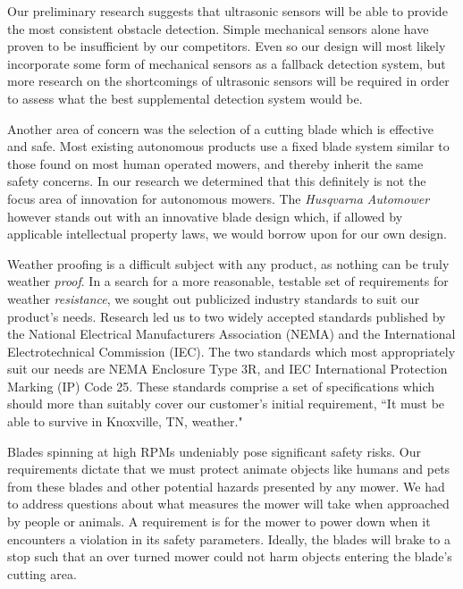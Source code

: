 \documentclass[12pt,letterpaper]{article}
\begin{document}
Our preliminary research suggests that ultrasonic sensors will be able to provide the most consistent obstacle detection.  Simple mechanical sensors alone have proven to be insufficient by our competitors. Even so our design will most likely incorporate some form of mechanical sensors as a fallback detection system, but more research on the shortcomings of ultrasonic sensors will be required in order to assess what the best supplemental detection system would be.  

Another area of concern was the selection of a cutting blade which is effective and safe.  Most existing autonomous products use a fixed blade system similar to those found on most human operated mowers, and thereby inherit the same safety concerns.  In our research we determined that this definitely is not the focus area of innovation for autonomous mowers. The \textit{Husqvarna Automower}\autocite{automower} however stands out with an innovative blade design which, if allowed by applicable intellectual property laws, we would borrow upon for our own design.

Weather proofing is a difficult subject with any product, as nothing can be truly weather \textit{proof}.  In a search for a more reasonable, testable set of requirements for weather \textit{resistance}, we sought out publicized industry standards to suit our product's needs.  Research led us to two widely accepted standards published by the National Electrical Manufacturers Association (NEMA) and the International Electrotechnical Commission (IEC).  The two standards which most appropriately suit our needs are NEMA Enclosure Type 3R\autocite{nema3r}, and IEC International Protection Marking (IP) Code 25.\autocite{ip25}  These standards comprise a set of specifications which should more than suitably cover our customer's initial requirement, ``It must be able to survive in Knoxville, TN, weather."

Blades spinning at high RPMs undeniably pose significant safety risks.  Our requirements dictate that we must protect animate objects like humans and pets from these blades and other potential hazards presented by any mower.  We had to address questions about what measures the mower will take when approached by people or animals.  A requirement is for the mower to power down when it encounters a violation in its safety parameters.  Ideally, the blades will brake to a stop such that an over turned mower could not harm objects entering the blade's cutting area.  
\end{document}

